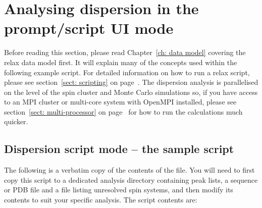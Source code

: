 \clearpage





\section{Analysing dispersion in the prompt/script UI mode}

Before reading this section, please read Chapter~\ref{ch: data model} covering the relax data model first.
It will explain many of the concepts used within the following example script.
For detailed information on how to run a relax script, please see section~\ref{sect: scripting} on page~\pageref{sect: scripting}.
The dispersion analysis is parallelised on the level of the spin cluster and Monte Carlo simulations so, if you have access to an MPI cluster or multi-core system with OpenMPI installed, please see section~\ref{sect: multi-processor} on page~\pageref{sect: multi-processor} for how to run the calculations much quicker.



\subsection{Dispersion script mode -- the sample script}

The following is a verbatim copy of the contents of the  file.
You will need to first copy this script to a dedicated analysis directory containing peak lists, a sequence or PDB file and a file listing unresolved spin systems, and then modify its contents to suit your specific analysis.
The script contents are:

